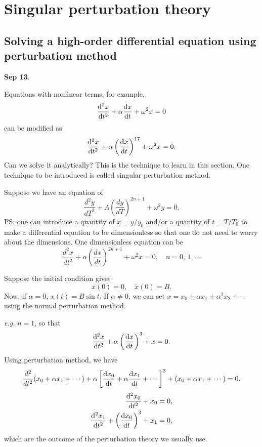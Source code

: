 \chapter{Singular perturbation theory}\label{chap:singularperturbation}
\section{Solving a high-order differential equation using perturbation method}
\textbf{Sep 13}.

Equations with nonlinear terms, for example, 
\begin{equation}
\frac{{\mathrm d}^2 {x}}{{\mathrm d}t^2}+ \alpha \frac{{\mathrm d} {x}}{{\mathrm d}t} + \omega^2 x = 0
\end{equation}
can be modified as
\begin{equation}
\frac{{\mathrm d}^2 {x}}{{\mathrm d}t^2}+ \alpha \left(\frac{{\mathrm d} {x}}{{\mathrm d}t}\right)^{17} + \omega^2 x = 0.
\end{equation}
Can we solve it analytically? This is the technique to learn in this section. One technique to be introduced is called singular perturbation method.

Suppose we have an equation of 
\begin{equation}
\frac{d^2y}{dT^2}+ A \left(\frac{dy}{dT}\right)^{2n+1} + \omega^2 y = 0.
\end{equation}
PS: one can introduce a quantity of $ x=y/y_0 $ and/or a quantity of $ t=T/T_0 $ to make a differential equation to be dimensionless so that one do not need to worry about the dimensions. One dimensionless equation can be 
\begin{equation}
\frac{d^2x}{dt^2}+ \alpha \left(\frac{dx}{dt}\right)^{2n+1} + \omega^2 x = 0,\quad n=0,\,1,\,\cdots 
\end{equation}

Suppose the initial condition gives
\begin{equation}
x(0)=0,\quad \dot{x}(0)=B.
\end{equation}
Now, if $ \alpha=0 $, $ x(t)=B\sin t $. If $ \alpha\neq 0 $, we can set $ x=x_0 +\alpha x_1+ \alpha^2 x_2 + \cdots $ using the normal perturbation method. 

\textit{e.g.} $n=1$, so that 
\begin{equation}
\frac{{\mathrm d}^2 {x}}{{\mathrm d}t^2} + \alpha \left( \frac{{\mathrm d} {x}}{{\mathrm d}t}\right)^3 + x =0.\label {alphasdt}
\end{equation}
Using perturbation method, we have
\begin{equation}
\frac{d^2}{dt^2}(x_0 + \alpha x_1 + \cdots)+ \alpha \left[ \frac{{\mathrm d} {x_0}}{{\mathrm d}t} + \alpha \frac{{\mathrm d} {x_1}}{{\mathrm d}t} + \cdots \right]^3 +(x_0 + \alpha x_1 + \cdots)=0.
\end{equation}
\begin{align}
\frac{{\mathrm d}^2 {x_0}}{{\mathrm d}t^2} + x_0 &=0, \label{pert1}\\
\frac{{\mathrm d}^2 {x_1}}{{\mathrm d}t^2} + \left( \frac{{\mathrm d} {x_0}}{{\mathrm d}t}\right)^3 + x_1 &= 0 \label {pert2},
\end{align}
which are the outcome of the perturbation theory we usually use. 


